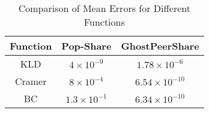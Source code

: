 
\begin{table}[h!]
\centering
\begin{tabular}{|c|c|c|}
\hline
\textbf{Function} & \textbf{Pop-Share} & \textbf{GhostPeerShare} \\
\hline
KLD     & $4 \times 10^{-9}$ & $1.78 \times 10^{-6}$ \\
Cramer  & $8 \times 10^{-4}$ & $6.54 \times 10^{-10}$ \\
BC      & $1.3 \times 10^{-1}$ & $6.34 \times 10^{-10}$ \\
\hline
\end{tabular}
\caption{Comparison of Mean Errors for Different Functions}
\label{table:mean-error}
\end{table}
